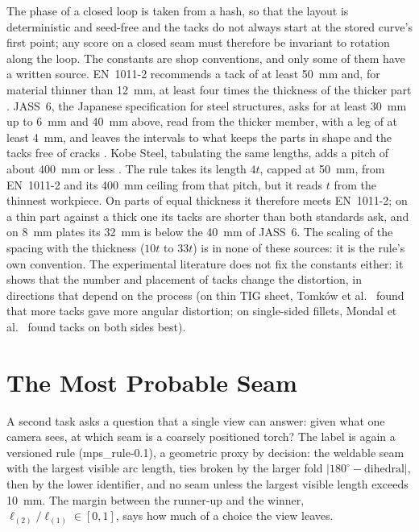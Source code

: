 
The phase of a closed loop is taken from a hash, so that the layout is deterministic and
seed-free and the tacks do not always start at the stored curve's first point; any score on a
closed seam must therefore be invariant to rotation along the loop. The constants are shop
conventions, and only some of them have a written source. EN~1011-2 recommends a tack of at least
50~mm and, for material thinner than 12~mm, at least four times the thickness of the thicker part
\cite{en1011_2}. JASS~6, the Japanese specification for steel structures, asks for at least 30~mm
up to 6~mm and 40~mm above, read from the thicker member, with a leg of at least 4~mm, and leaves the
intervals to what keeps the parts in shape and the tacks free of cracks \cite{jass6}. Kobe Steel,
tabulating the same lengths, adds a pitch of about 400~mm or less \cite{kobelco_tack}. The rule takes
its length $4t$, capped at 50~mm, from EN~1011-2 and its 400~mm ceiling from that pitch, but it reads
$t$ from the thinnest workpiece. On parts of equal thickness it therefore meets EN~1011-2; on a thin
part against a thick one its tacks are shorter than both standards ask, and on 8~mm plates its 32~mm
is below the 40~mm of JASS~6. The scaling of the spacing with the thickness ($10t$ to $33t$) is in
none of these sources: it is the rule's own convention. The experimental literature does not fix the constants either: it shows that the number
and placement of tacks change the distortion, in directions that depend on the process (on thin
TIG sheet, Tomk\'ow et al.\ \cite{tomkow2020tacks} found that more tacks gave more angular
distortion; on single-sided fillets, Mondal et al.\ \cite{mondal2015tacking} found tacks on both
sides best).

\section{The Most Probable Seam}
\label{sec:ws_mps}
A second task asks a question that a single view can answer: given what one camera sees, at
which seam is a coarsely positioned torch? The label is again a versioned rule
(mps\_rule-0.1), a geometric proxy by decision: the weldable seam with the largest visible
arc length, ties broken by the larger fold $|180^\circ-\text{dihedral}|$, then by the lower
identifier, and no seam unless the largest visible length exceeds 10~mm. The margin between the
runner-up and the winner, $\ell_{(2)}/\ell_{(1)}\in[0,1]$, says how much of a choice the view
leaves.


